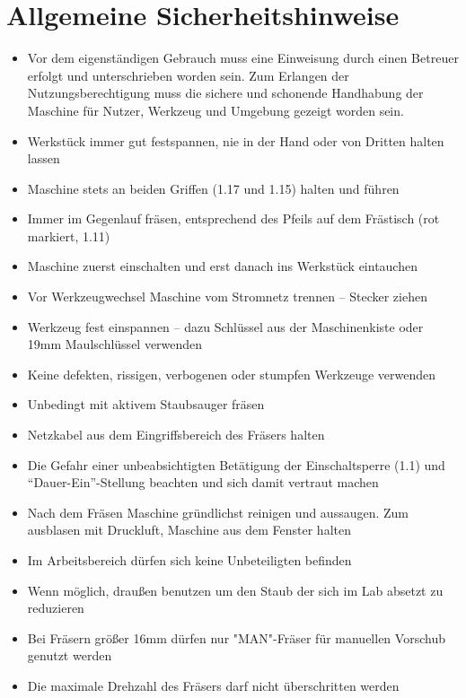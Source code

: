 \documentclass{\basedir/fablab-document}
\begin{document}
\section[Allgemeine Sicherheitshinweise]{Allgemeine Sicherheitshinweise}
\begin{itemize}
\item {\color{red} Vor dem eigenständigen Gebrauch muss eine Einweisung durch einen Betreuer erfolgt und unterschrieben worden sein. Zum Erlangen der Nutzungsberechtigung muss die sichere und schonende Handhabung der Maschine für Nutzer, Werkzeug und Umgebung gezeigt worden sein.}
\item Werkstück immer gut festspannen, nie in der Hand oder von Dritten halten lassen
\item Maschine stets an beiden Griffen (1.17 und 1.15) halten und führen
\item Immer im Gegenlauf fräsen, entsprechend des Pfeils auf dem Frästisch (rot markiert, 1.11)
\item Maschine zuerst einschalten und erst danach ins Werkstück eintauchen
\item Vor Werkzeugwechsel Maschine vom Stromnetz trennen -- Stecker ziehen
\item Werkzeug fest einspannen -- dazu Schlüssel aus der Maschinenkiste oder 19mm Maulschlüssel verwenden
\item Keine defekten, rissigen, verbogenen oder stumpfen Werkzeuge verwenden
\item Unbedingt mit aktivem Staubsauger fräsen
\item Netzkabel aus dem Eingriffsbereich des Fräsers halten
\item Die Gefahr einer unbeabsichtigten Betätigung der Einschaltsperre (1.1) und ``Dauer-Ein''-Stellung beachten und sich damit vertraut machen
\item Nach dem Fräsen Maschine gründlichst reinigen und aussaugen. Zum ausblasen mit Druckluft, Maschine aus dem Fenster halten
\item Im Arbeitsbereich dürfen sich keine Unbeteiligten befinden
\item Wenn möglich, draußen benutzen um den Staub der sich im Lab absetzt zu reduzieren
\item Bei Fräsern größer 16mm dürfen nur "MAN"-Fräser für manuellen Vorschub genutzt werden
\item Die maximale Drehzahl des Fräsers darf nicht überschritten werden
\end{itemize}
\end{document}
